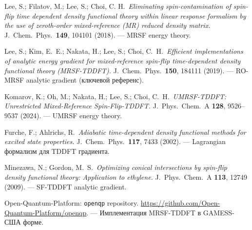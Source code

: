 \documentclass[11pt, a4paper]{article}
\theoremstyle{definition}
\begin{document}
\begin{enumerate}[label={[\arabic*]}]
    \item Lee, S.; Filatov, M.; Lee, S.; Choi, C. H.\ \emph{Eliminating spin-contamination of spin-flip time dependent density functional theory within linear response formalism by the use of zeroth-order mixed-reference (MR) reduced density matrix.} J.\ Chem.\ Phys.\ \textbf{149}, 104101 (2018). --- MRSF energy theory.
    \item Lee, S.; Kim, E.\ E.; Nakata, H.; Lee, S.; Choi, C.\ H.\ \emph{Efficient implementations of analytic energy gradient for mixed-reference spin-flip time-dependent density functional theory (MRSF-TDDFT).} J.\ Chem.\ Phys.\ \textbf{150}, 184111 (2019). --- RO-MRSF analytic gradient (ключевой референс).
    \item Komarov, K.; Oh, M.; Nakata, H.; Lee, S.; Choi, C.\ H.\ \emph{UMRSF-TDDFT: Unrestricted Mixed-Reference Spin-Flip-TDDFT.} J.\ Phys.\ Chem.\ A \textbf{128}, 9526--9537 (2024). --- UMRSF energy theory.
    \item Furche, F.; Ahlrichs, R.\ \emph{Adiabatic time-dependent density functional methods for excited state properties.} J.\ Chem.\ Phys.\ \textbf{117}, 7433 (2002). --- Lagrangian формализм для TDDFT градиента.
    \item Minezawa, N.; Gordon, M.\ S.\ \emph{Optimizing conical intersections by spin-flip density functional theory: Application to ethylene.} J.\ Phys.\ Chem.\ A \textbf{113}, 12749 (2009). --- SF-TDDFT analytic gradient.
    \item Open-Quantum-Platform: \texttt{openqp} repository. \url{https://github.com/Open-Quantum-Platform/openqp}. --- Имплементация MRSF-TDDFT в GAMESS-США форме.
\end{enumerate}
\end{document}
